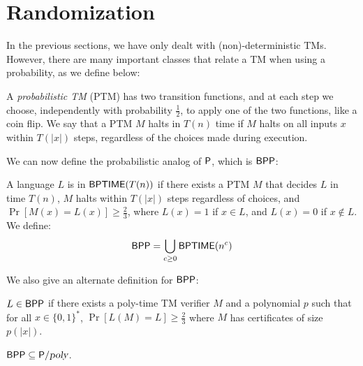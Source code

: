 \section{Randomization}

In the previous sections, we have only dealt with (non)-deterministic TMs. However, there are many important classes that relate a TM when using a probability, as we define below:

\begin{definition}
A \emph{probabilistic TM} (PTM) has two transition functions, and at each step we choose, independently with probability $\frac{1}{2}$, to apply one of the two functions, like a coin flip. We say that a PTM $M$ halts in $T(n)$ time if $M$ halts on all inputs $x$ within $T(|x|)$ steps, regardless of the choices made during execution.
\end{definition}

We can now define the probabilistic analog of $\P$, which is $\BPP$:
\begin{definition}
A language $L$ is in $\BPTIME(T(n))$ if there exists a PTM $M$ that decides $L$ in time $T(n)$, $M$ halts within $T(|x|)$ steps regardless of choices, and $\Pr[M(x) = L(x)] \ge \frac{2}{3}$, where $L(x) = 1$ if $x \in L$, and $L(x) = 0$ if $x \notin L$. We define:
\[
\BPP = \bigcup_{c \ge 0}\BPTIME(n^c)
\]
\end{definition}

We also give an alternate definition for $\BPP$:
\begin{definition}
$L \in \BPP$ if there exists a poly-time TM verifier $M$ and a polynomial $p$ such that for all $x \in \{0, 1\}^*$, $\Pr[L(M) = L] \ge \frac{2}{3}$ where $M$ has certificates of size $p(|x|)$.
\end{definition}

\begin{theorem}
$\BPP \subseteq \Ppoly$.
\end{theorem}

